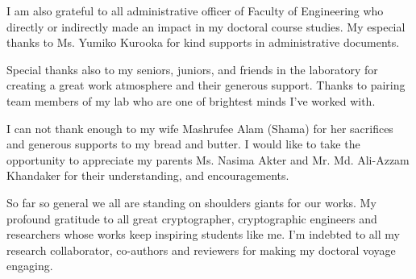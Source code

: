 \documentclass[a4paper]{article}
\begin{document}
\vspace{5pt}
I am also grateful to all  administrative officer of Faculty of Engineering who directly or indirectly made an impact in my doctoral course studies. My especial thanks to Ms. Yumiko Kurooka for kind supports in administrative documents.

\vspace{5pt}
Special thanks also to my seniors, juniors, and friends in the  laboratory for creating a great work atmosphere and  their generous support.  
Thanks to pairing team members of my lab who are one of brightest minds I've worked with.

\vspace{5pt}
I can not thank enough to my wife Mashrufee Alam (Shama) for her sacrifices and generous supports to my bread and butter. 
I would like to take the opportunity to appreciate my parents Ms. Nasima Akter and Mr. Md. Ali-Azzam Khandaker for their understanding, and encouragements.

\vspace{5pt}
So far so general we all are standing on shoulders giants for our works. 
My profound gratitude to all great cryptographer, cryptographic engineers and researchers whose works keep inspiring students like me.
I'm indebted to all my research collaborator, co-authors and reviewers for making my doctoral voyage engaging.
\end{document}

